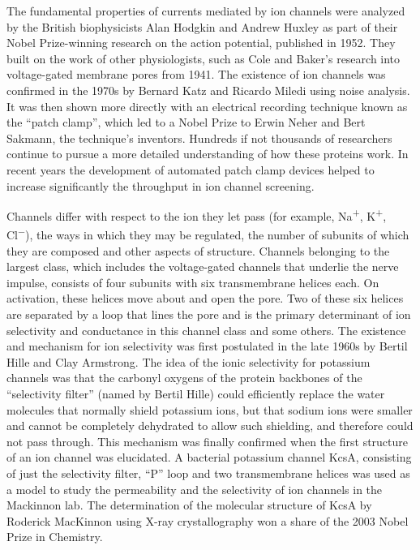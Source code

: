 \documentclass[]{book}
\begin{document}
The fundamental properties of currents mediated by ion channels were analyzed by the British biophysicists Alan Hodgkin and Andrew Huxley as part of their Nobel Prize-winning research on the action potential, published in 1952. They built on the work of other physiologists, such as Cole and Baker's research into voltage-gated membrane pores from 1941. The existence of ion channels was confirmed in the 1970s by Bernard Katz and Ricardo Miledi using noise analysis. It was then shown more directly with an electrical recording technique known as the ``patch clamp'', which led to a Nobel Prize to Erwin Neher and Bert Sakmann, the technique's inventors. Hundreds if not thousands of researchers continue to pursue a more detailed understanding of how these proteins work. In recent years the development of automated patch clamp devices helped to increase significantly the throughput in ion channel screening.

Channels differ with respect to the ion they let pass (for example, Na\textsuperscript{+}, K\textsuperscript{+}, Cl\textsuperscript{−}), the ways in which they may be regulated, the number of subunits of which they are composed and other aspects of structure. Channels belonging to the largest class, which includes the voltage-gated channels that underlie the nerve impulse, consists of four subunits with six transmembrane helices each. On activation, these helices move about and open the pore. Two of these six helices are separated by a loop that lines the pore and is the primary determinant of ion selectivity and conductance in this channel class and some others. The existence and mechanism for ion selectivity was first postulated in the late 1960s by Bertil Hille and Clay Armstrong. The idea of the ionic selectivity for potassium channels was that the carbonyl oxygens of the protein backbones of the ``selectivity filter'' (named by Bertil Hille) could efficiently replace the water molecules that normally shield potassium ions, but that sodium ions were smaller and cannot be completely dehydrated to allow such shielding, and therefore could not pass through. This mechanism was finally confirmed when the first structure of an ion channel was elucidated. A bacterial potassium channel KcsA, consisting of just the selectivity filter, ``P'' loop and two transmembrane helices was used as a model to study the permeability and the selectivity of ion channels in the Mackinnon lab. The determination of the molecular structure of KcsA by Roderick MacKinnon using X-ray crystallography won a share of the 2003 Nobel Prize in Chemistry.
\end{document}

